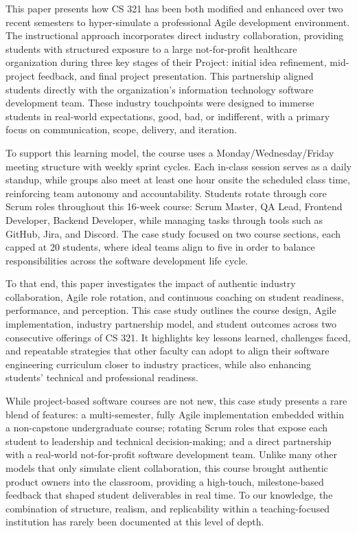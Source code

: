 \documentclass{article}
\begin{document}
This paper presents how CS 321 has been both modified and enhanced over two recent semesters to hyper-simulate a professional Agile development environment. The instructional approach incorporates direct industry collaboration, providing students with structured exposure to a large not-for-profit healthcare organization during three key stages of their Project: initial idea refinement, mid-project feedback, and final project presentation. This partnership aligned students directly with the organization's information technology software development team. These industry touchpoints were designed to immerse students in real-world expectations, good, bad, or indifferent, with a primary focus on communication, scope, delivery, and iteration.

To support this learning model, the course uses a Monday/Wednesday/Friday meeting structure with weekly sprint cycles. Each in-class session serves as a daily standup, while groups also meet at least one hour onsite the scheduled class time, reinforcing team autonomy and accountability. Students rotate through core Scrum roles throughout this 16-week course: Scrum Master, QA Lead, Frontend Developer, Backend Developer, while managing tasks through tools such as GitHub, Jira, and Discord. The case study focused on two course sections, each capped at 20 students, where ideal teams align to five in order to balance responsibilities across the software development life cycle.

To that end, this paper investigates the impact of authentic industry collaboration, Agile role rotation, and continuous coaching on student readiness, performance, and perception. This case study outlines the course design, Agile implementation, industry partnership model, and student outcomes across two consecutive offerings of CS 321. It highlights key lessons learned, challenges faced, and repeatable strategies that other faculty can adopt to align their software engineering curriculum closer to industry practices, while also enhancing students’ technical and professional readiness.

While project-based software courses are not new, this case study presents a rare blend of features: a multi-semester, fully Agile implementation embedded within a non-capstone undergraduate course; rotating Scrum roles that expose each student to leadership and technical decision-making; and a direct partnership with a real-world not-for-profit software development team. Unlike many other models that only simulate client collaboration, this course brought authentic product owners into the classroom, providing a high-touch, milestone-based feedback that shaped student deliverables in real time. To our knowledge, the combination of structure, realism, and replicability within a teaching-focused institution has rarely been documented at this level of depth.
\end{document}

